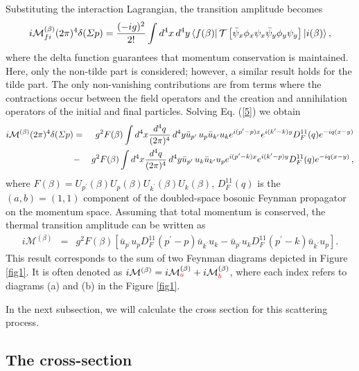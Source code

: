 \documentclass[11pt,showpacs,preprintnumbers,amsmath,amssymb,prd,nofootinbib,superscriptaddress]{revtex4-2}
\begin{document}
Substituting the interaction Lagrangian, the transition amplitude becomes
\begin{equation}
\label{5}
    i\mathcal{M}_{fi}^{(\beta)} (2\pi)^4 \delta (\Sigma p) = \frac{(-ig)^2}{2!}\int d^4x \, d^4y \bra{f(\beta)} \mathcal{T}\left[ \Bar{\psi}_x\phi _x\psi _x \Bar{\psi}_y \phi _y\psi _y\right] \ket{i(\beta)},
\end{equation}
where the delta function guarantees that momentum conservation is maintained. Here, only the non-tilde part is considered; however, a similar result holds for the tilde part. The only non-vanishing contributions are from terms where the contractions occur between the field operators and the creation and annihilation operators of the initial and final particles. 
Solving Eq. (\ref{5})  we obtain
\begin{eqnarray}
    \label{}
    \nonumber i\mathcal{M}^{(\beta)}(2\pi)^4 \delta (\Sigma p) &=&  g^2F(\beta)\int d^4x \frac{d^4q}{(2\pi)^4} \, d^4y \Bar{u}_{{p}^\prime}\, u_p \Bar{u}_{{k}^\prime} u_k e^{i(p^\prime-p)x} e^{i(k^\prime-k)y} D_F^{11}(q) e^{-iq(x-y)} \\
    &-& g^2F(\beta)\int d^4x \frac{d^4q}{(2\pi)^4} \, d^4y \Bar{u}_{{p}^\prime}\, u_k \Bar{u}_{{k}^\prime} u_p e^{i(p^\prime-k)x} e^{i(k^\prime-p)y} D_F^{11}(q) e^{-iq(x-y)} \, ,
\end{eqnarray}
 where $F(\beta)=U_{p^\prime}(\beta)U_{p}(\beta)U_{k^\prime}(\beta)U_{k}(\beta)$, $D^{11}_F(q)$ is the $(a,b)=(1,1)$ component of the doubled-space bosonic Feynman propagator on the momentum space. Assuming that total momentum is conserved, the thermal transition amplitude can be written as
\begin{eqnarray}
    i\mathcal{M}^{(\beta)}&=&g^2F(\beta)\left[\bar{u}_{p^\prime}u_pD_F^{11}(p^\prime-p)\bar{u}_{k^\prime}u_k-\bar{u}_{p^\prime}u_kD_F^{11}(p^\prime-k)\bar{u}_{k^\prime}u_p\right].\label{eq08}
\end{eqnarray}
This result corresponds to the sum of two Feynman diagrams depicted in Figure \ref{fig1}. It is often denoted as $i\mathcal{M}^{(\beta)}=i\mathcal{M}_{\textcolor{red}{a}}^{(\beta)}+i\mathcal{M}_{\textcolor{red}{b}}^{(\beta)}$, where each index refers to diagrams (a) and (b) in the Figure \ref{fig1}.

In the next subsection, we will calculate the cross section for this scattering process.

\subsection{The cross-section}\label{secsigma}
\end{document}
